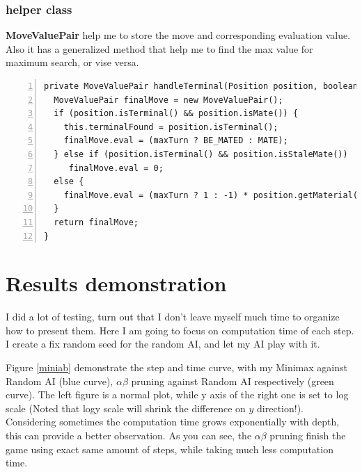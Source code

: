 \documentclass{article}
\begin{document}
\subsubsection{helper class}

\textbf{MoveValuePair} help me to store the move and corresponding evaluation value. Also it has a generalized method that help me to find the max value for maximum search, or vise versa.

\begin{lstlisting}[numbers=left]
private MoveValuePair handleTerminal(Position position, boolean maxTurn) {
  MoveValuePair finalMove = new MoveValuePair();
  if (position.isTerminal() && position.isMate()) {
    this.terminalFound = position.isTerminal();
    finalMove.eval = (maxTurn ? BE_MATED : MATE);
  } else if (position.isTerminal() && position.isStaleMate())
     finalMove.eval = 0;
  else {
    finalMove.eval = (maxTurn ? 1 : -1) * position.getMaterial();
  }
  return finalMove;
}
\end{lstlisting}





























\clearpage
\section{Results demonstration}


I did a lot of testing, turn out that I don't leave myself much time to organize how to present them. Here I am going to focus on computation time of each step. I create a fix random seed for the random AI, and let my AI play with it. 

Figure \ref{miniab} demonstrate the step and time curve, with my Minimax against Random AI (blue curve),  $\alpha\beta$ pruning against Random AI respectively (green curve). The left figure is a normal plot, while y axis of the right one is set to log scale (Noted that logy scale will shrink the difference on $y$ direction!). Considering sometimes the computation time grows exponentially with depth, this can provide a better observation. As you can see, the $\alpha\beta$ pruning finish the game using exact same amount of steps, while taking much less computation time.
\end{document}
